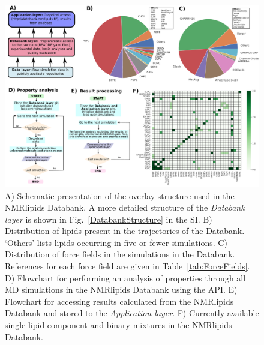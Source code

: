 \documentclass[fleqn,10pt]{wlscirep}
\begin{document}
\begin{figure}[t]
    \centering
    \includegraphics[width=\linewidth]{Figures/overlay3.pdf}
    \caption{A) Schematic presentation of the overlay structure used in the NMRlipids Databank. A more detailed structure of the \textit{Databank layer} is shown in Fig.~\ref{DatabankStructure} in the SI.
    B) Distribution of lipids present in the trajectories of the Databank. `Others' lists lipids occurring in five or fewer simulations. 
    C) Distribution of force fields in the simulations in the Databank. References for each force field are given in Table~\ref{tab:ForceFields}.
    D) Flowchart for performing an analysis of properties through all MD simulations in the NMRlipids Databank using the API.
    E) Flowchart for accessing results calculated from the NMRlipids Databank and stored to the \textit{Application layer}.
    F) Currently available single lipid component and binary mixtures in the NMRlipids Databank.  
    }
    \label{fig:overlay}
\end{figure}
\end{document}
